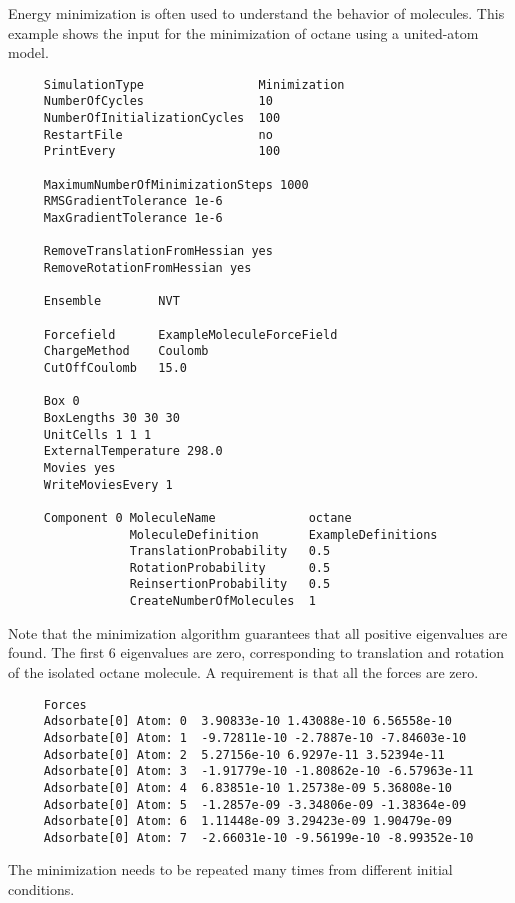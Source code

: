 Energy minimization is often used to understand the behavior of molecules.
This example shows the input for the minimization of octane using a united-atom model\cite{Dubbeldam2004}.
\begin{tiny}
\begin{verbatim}
     SimulationType                Minimization
     NumberOfCycles                10
     NumberOfInitializationCycles  100
     RestartFile                   no
     PrintEvery                    100

     MaximumNumberOfMinimizationSteps 1000
     RMSGradientTolerance 1e-6
     MaxGradientTolerance 1e-6

     RemoveTranslationFromHessian yes
     RemoveRotationFromHessian yes

     Ensemble        NVT

     Forcefield      ExampleMoleculeForceField
     ChargeMethod    Coulomb
     CutOffCoulomb   15.0

     Box 0
     BoxLengths 30 30 30
     UnitCells 1 1 1
     ExternalTemperature 298.0
     Movies yes
     WriteMoviesEvery 1

     Component 0 MoleculeName             octane
                 MoleculeDefinition       ExampleDefinitions
                 TranslationProbability   0.5
                 RotationProbability      0.5
                 ReinsertionProbability   0.5
                 CreateNumberOfMolecules  1
\end{verbatim}
\end{tiny}
Note that the minimization algorithm guarantees that all positive eigenvalues are found.
The first 6 eigenvalues are zero, corresponding to translation and rotation of the isolated octane molecule.
A requirement is that all the forces are zero.
\begin{tiny}
\begin{verbatim}
     Forces
     Adsorbate[0] Atom: 0  3.90833e-10 1.43088e-10 6.56558e-10
     Adsorbate[0] Atom: 1  -9.72811e-10 -2.7887e-10 -7.84603e-10
     Adsorbate[0] Atom: 2  5.27156e-10 6.9297e-11 3.52394e-11
     Adsorbate[0] Atom: 3  -1.91779e-10 -1.80862e-10 -6.57963e-11
     Adsorbate[0] Atom: 4  6.83851e-10 1.25738e-09 5.36808e-10
     Adsorbate[0] Atom: 5  -1.2857e-09 -3.34806e-09 -1.38364e-09
     Adsorbate[0] Atom: 6  1.11448e-09 3.29423e-09 1.90479e-09
     Adsorbate[0] Atom: 7  -2.66031e-10 -9.56199e-10 -8.99352e-10
\end{verbatim}
\end{tiny}
The minimization needs to be repeated many times from different initial conditions.
